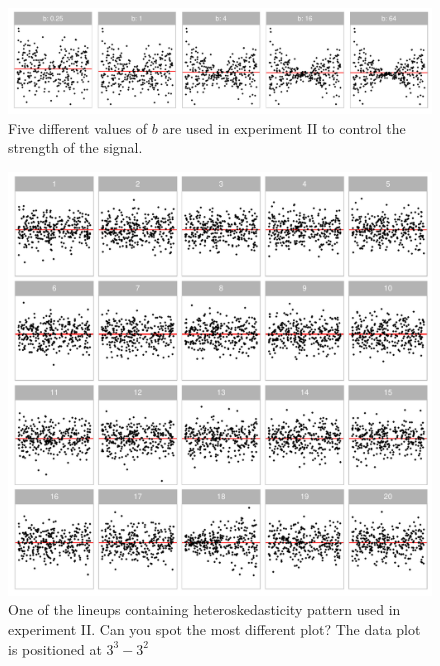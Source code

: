 \documentclass[]{interact}
\theoremstyle{plain}%
\theoremstyle{definition}
\theoremstyle{remark}
\begin{document}
\begin{figure}

{\centering \includegraphics[width=1\linewidth]{paper_comparison_files/figure-latex/different-b-1} 

}

\caption{Five different values of $b$ are used in experiment II to control the strength of the signal.}\label{fig:different-b}
\end{figure}

\begin{figure}

{\centering \includegraphics[width=1\linewidth]{paper_comparison_files/figure-latex/example-heter-lineup-1} 

}

\caption{One of the lineups containing heteroskedasticity pattern used in experiment II. Can you spot the most different plot? The data plot is positioned at $3^3 - 3^2$}\label{fig:example-heter-lineup}
\end{figure}
\end{document}
